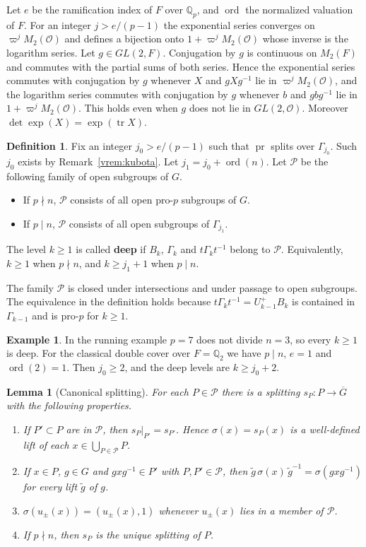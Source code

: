 \documentclass[12pt,letterpaper]{amsart}
\numberwithin{equation}{section}
\newtheorem{lemma}[theorem]{Lemma}
\theoremstyle{definition}
\newtheorem{definition}[theorem]{Definition}
\newtheorem{example}[theorem]{Example}
\theoremstyle{remark}
\DeclareMathOperator{\ord}{ord}
\DeclareMathOperator{\pr}{pr}
\DeclareMathOperator{\tr}{tr}
\newcommand{\cO}{\mathcal{O}}
\newcommand{\cP}{\mathcal{P}}
\newcommand{\Gbar}{\overline{G}}
\begin{document}
Let $e$ be the ramification index of $F$ over $\mathbb{Q}_p$, and
$\ord$ the normalized valuation of $F$. For an integer $j>e/(p-1)$ the
exponential series converges on $\varpi^jM_2(\cO)$ and defines a
bijection onto $1+\varpi^jM_2(\cO)$ whose inverse is the logarithm
series. Let $g\in GL(2,F)$. Conjugation by $g$ is continuous on
$M_2(F)$ and commutes with the partial sums of both series. Hence the
exponential series commutes with conjugation by $g$ whenever $X$ and
$gXg^{-1}$ lie in $\varpi^jM_2(\cO)$, and the logarithm series commutes
with conjugation by $g$ whenever $b$ and $gbg^{-1}$ lie in
$1+\varpi^jM_2(\cO)$. This holds even when $g$ does not lie in
$GL(2,\cO)$. Moreover $\det\exp(X)=\exp(\tr X)$.

\begin{definition}
\label{def:deep}
Fix an integer $j_0>e/(p-1)$ such that $\pr$ splits over
$\Gamma_{j_0}$. Such $j_0$ exists by Remark~\ref{vrem:kubota}. Let
$j_1=j_0+\ord(n)$. Let $\cP$ be the following family of open subgroups
of $G$.
\begin{itemize}[leftmargin=2em]
\item If $p\nmid n$, $\cP$ consists of all open pro-$p$ subgroups of
$G$.
\item If $p\mid n$, $\cP$ consists of all open subgroups of
$\Gamma_{j_1}$.
\end{itemize}
The level $k\geq 1$ is called \textbf{deep} if $B_k$, $\Gamma_k$ and
$t\Gamma_kt^{-1}$ belong to $\cP$. Equivalently, $k\geq 1$ when
$p\nmid n$, and $k\geq j_1+1$ when $p\mid n$.
\end{definition}

The family $\cP$ is closed under intersections and under passage to
open subgroups. The equivalence in the definition holds because
$t\Gamma_kt^{-1}=U^+_{k-1}B_k$ is contained in $\Gamma_{k-1}$ and is
pro-$p$ for $k\geq 1$.

\begin{example}
\label{ex:deep}
In the running example $p=7$ does not divide $n=3$, so every $k\geq 1$
is deep. For the classical double cover over $F=\mathbb{Q}_2$ we have
$p\mid n$, $e=1$ and $\ord(2)=1$. Then $j_0\geq 2$, and the deep levels
are $k\geq j_0+2$.
\end{example}

\begin{lemma}[Canonical splitting]
\label{lemma:canonical}
For each $P\in\cP$ there is a splitting $s_P:P\to\Gbar$ with the
following properties.
\begin{enumerate}[leftmargin=2em,label=(\alph*)]
\item If $P'\subset P$ are in $\cP$, then $s_P|_{P'}=s_{P'}$. Hence
$\sigma(x)=s_P(x)$ is a well-defined lift of each
$x\in\bigcup_{P\in\cP}P$.
\item If $x\in P$, $g\in G$ and $gxg^{-1}\in P'$ with $P,P'\in\cP$,
then $\tilde g\,\sigma(x)\,\tilde g^{-1}=\sigma(gxg^{-1})$ for every
lift $\tilde g$ of $g$.
\item $\sigma(u_\pm(x))=(u_\pm(x),1)$ whenever $u_\pm(x)$ lies in a
member of $\cP$.
\item If $p\nmid n$, then $s_P$ is the unique splitting of $P$.
\end{enumerate}
\end{lemma}
\end{document}
